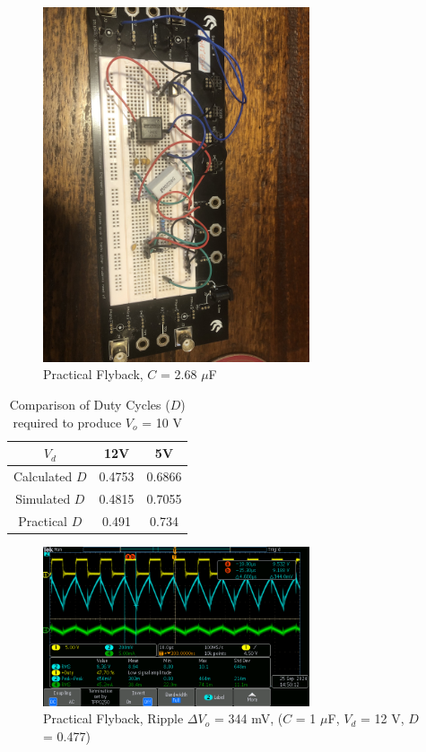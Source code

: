 \documentclass[12pt,twoside]{scrartcl}
\begin{document}
\begin{figure}[htp]
    \centering
    \includegraphics[width=0.7\textwidth]{Flyback_Built.jpg}
    \caption{Practical Flyback, $C$ = 2.68 $\mu$F}
    \label{fig:Practical}
\end{figure}

\begin{table}[h!]
    \centering
    \caption{Comparison of Duty Cycles ($D$) required to produce $V_o$ = 10 V}
    \begin{tabular}{c|c c}
    $V_d$ & 12V & 5V \\
    \hline
    Calculated $D$ & 0.4753 & 0.6866 \\
    
    Simulated $D$ & 0.4815 & 0.7055 \\
    
    Practical $D$ & 0.491 & 0.734 \\
    
    \end{tabular}
    
    \label{tab:duty_cycle}
    \end{table}
    

\newpage

\begin{figure}[htp]
    \centering
    \includegraphics[width=0.7\textwidth]{Flyback/tek0001.png}
    \caption{Practical Flyback, Ripple $\Delta V_o$ = 344 mV, ($C$ = 1 $\mu$F, $V_d$ = 12 V, $D$ = 0.477)}
    \label{fig:Practical1}
\end{figure}
\end{document}
